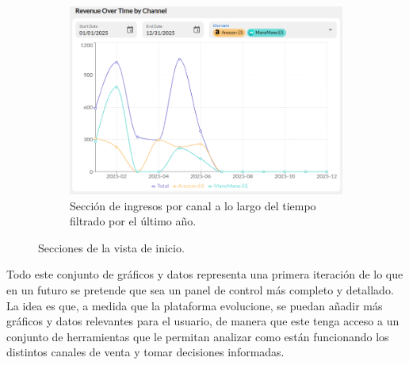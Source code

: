 \begin{figure}[H]
\begin{subfigure}{0.48\linewidth}
        \includegraphics[width=\linewidth]{figures/design_develop/screenshots/dash_sec4.png}
        \caption{Sección de ingresos por canal a lo largo del tiempo filtrado por el último año.}
    \end{subfigure}
    \caption{Secciones de la vista de inicio.}
    \label{fig:dev:ss:vista_inicio_secciones}
\end{figure}


Todo este conjunto de gráficos y datos representa una primera iteración de lo que en un futuro se pretende que sea un panel de control más completo y detallado. La idea es que, a medida que la plataforma evolucione, se puedan añadir más gráficos y datos relevantes para el usuario, de manera que este tenga acceso a un conjunto de herramientas que le permitan analizar como están funcionando los distintos canales de venta y tomar decisiones informadas.